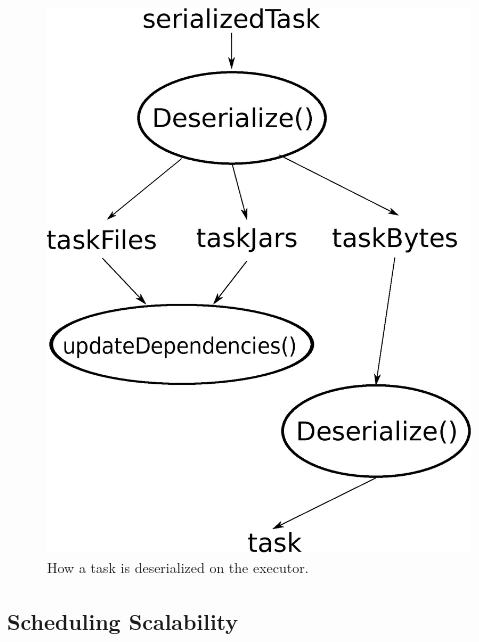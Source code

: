 \begin{figure}[t!]
  \begin{center}
    \includegraphics[scale=0.30]{images_graphs/deserialization.eps}
  \end{center}
  \caption{How a task is deserialized on the executor. }
  \label{fig:deserialization}
\end{figure}

\subsection{Scheduling Scalability}

